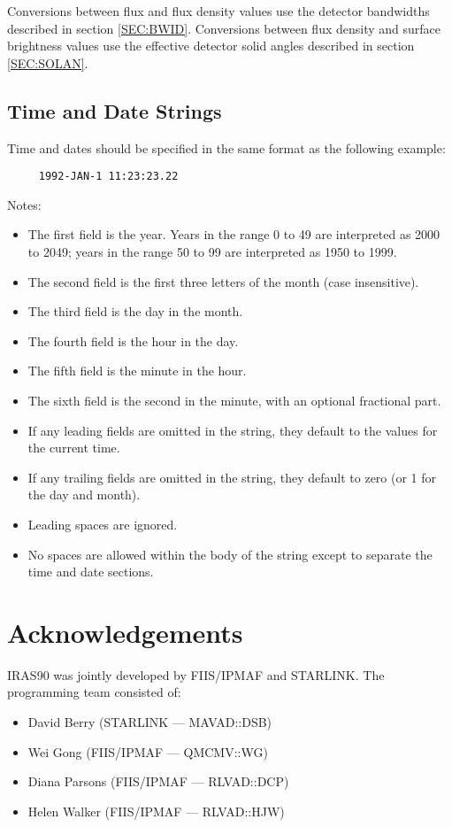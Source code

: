 Conversions between flux and flux density  values use the detector bandwidths
described in section \ref{SEC:BWID}. Conversions between flux density and
surface brightness  values use the effective detector solid angles described in
section \ref{SEC:SOLAN}.

\subsection{Time and Date Strings}
\label{SEC:TIM}
Time and dates should be specified in the same format as the
following example:

\small
\begin{verbatim}
     1992-JAN-1 11:23:23.22
\end{verbatim}
\normalsize

Notes:
\begin{itemize}
\item The first field is the year. Years in the range 0 to 49
     are interpreted as 2000 to 2049; years in the range 50
     to 99 are interpreted as 1950 to 1999.
\item The second field is the first three letters of the month
     (case insensitive).
\item The third field is the day in the month.
\item The fourth field is the hour in the day.
\item The fifth field is the minute in the hour.
\item The sixth field is the second in the minute, with an
     optional fractional part.
\item If any leading fields are omitted in the string, they
     default to the values for the current time.
\item If any trailing fields are omitted in the string, they
     default to zero (or 1 for the day and month).
\item Leading spaces are ignored.
\item No spaces are allowed within the body of the string except
     to separate the time and date sections.
\end{itemize}

\section{Acknowledgements}
{\small IRAS90} was jointly developed by {\small FIIS/IPMAF} and
{\small STARLINK}. The programming team consisted of:
\begin{itemize}
\item David Berry (STARLINK --- MAVAD::DSB)
\item Wei Gong (FIIS/IPMAF --- QMCMV::WG)
\item Diana Parsons (FIIS/IPMAF --- RLVAD::DCP)
\item Helen Walker (FIIS/IPMAF --- RLVAD::HJW)
\end{itemize}

